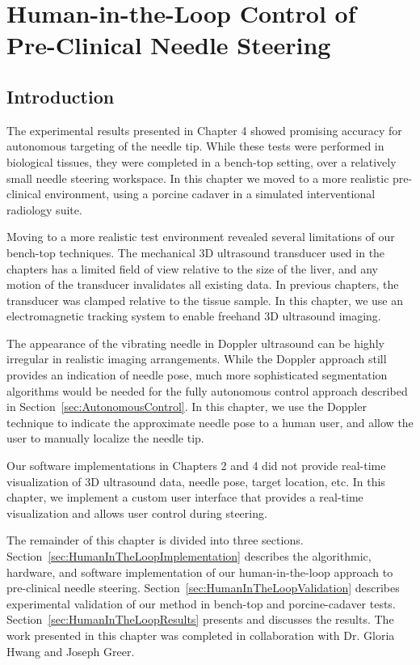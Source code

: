 \chapter[Human-in-the-Loop Control]{Human-in-the-Loop Control of Pre-Clinical Needle Steering}

\section{Introduction}
The experimental results presented in Chapter 4 showed promising accuracy for autonomous targeting of the needle tip. While these tests were performed in biological tissues, they were completed in a bench-top setting, over a relatively small needle steering workspace. In this chapter we moved to a more realistic pre-clinical environment, using a porcine cadaver in a simulated interventional radiology suite. 

Moving to a more realistic test environment revealed several limitations of our bench-top techniques. The mechanical 3D ultrasound transducer used in the chapters has a limited field of view relative to the size of the liver, and any motion of the transducer invalidates all existing data. In previous chapters, the transducer was clamped relative to the tissue sample. In this chapter, we use an electromagnetic tracking system to enable freehand 3D ultrasound imaging. 

The appearance of the vibrating needle in Doppler ultrasound can be highly irregular in realistic imaging arrangements. While the Doppler approach still provides an indication of needle pose, much more sophisticated segmentation algorithms would be needed for the fully autonomous control approach described in Section~\ref{sec:AutonomousControl}. In this chapter, we use the Doppler technique to indicate the approximate needle pose to a human user, and allow the user to manually localize the needle tip. 

Our software implementations in Chapters 2 and 4 did not provide real-time visualization of 3D ultrasound data, needle pose, target location, etc. In this chapter, we implement a custom user interface that provides a real-time visualization and allows user control during steering. 

The remainder of this chapter is divided into three sections. Section~\ref{sec:HumanInTheLoopImplementation} describes the algorithmic, hardware, and software implementation of our human-in-the-loop approach to pre-clinical needle steering. Section~\ref{sec:HumanInTheLoopValidation} describes experimental validation of our method in bench-top and porcine-cadaver tests. Section~\ref{sec:HumanInTheLoopResults} presents and discusses the results. The work presented in this chapter was completed in collaboration with Dr. Gloria Hwang and Joseph Greer.

